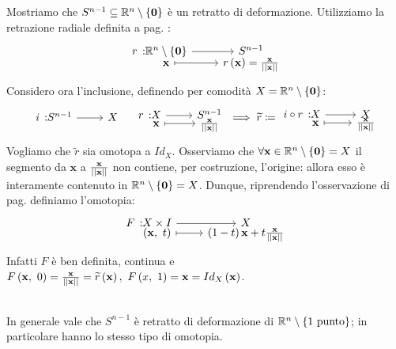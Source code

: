 \begin{example}
	\label{retrattosfera}
	Mostriamo che $S^{n-1}\subseteq \mathbb{R}^n\setminus\left\{\mathbf{0}\right\}$ è un retratto di deformazione. Utilizziamo la retrazione radiale definita a pag. \pageref{retrazioneradiale}:
		\begin{equation*}
		\funztot{r}{\realset^n\setminus\left\{\mathbf{0}\right\}}{S^{n-1}}{\mathbf{x}}{r\left(\mathbf{x}\right)=\frac{\mathbf{x}}{\labs \mathbf{x}\rabs}}
	\end{equation*}
Considero ora l'inclusione, definendo per comodità $X=\mathbb{R}^n\setminus\left\{\mathbf{0}\right\}$:
\begin{equation*}
	\funz{i}{S^{n-1}}{X}\quad 		\funztot{r}{X}{S^{n-1}}{\mathbf{x}}{\frac{\mathbf{x}}{\labs \mathbf{x}\rabs}}\implies \widetilde{r}\coloneqq\funztot{ i\circ r}{X}{X}{\mathbf{x}}{\frac{\mathbf{x}}{\labs \mathbf{x}\rabs}}
\end{equation*}
Vogliamo che $\widetilde{r}$ sia omotopa a $Id_X$.
Osserviamo che $\forall \mathbf{x}\in\mathbb{R}^n\setminus\left\{\mathbf{0}\right\}=X$ il segmento da $\mathbf{x}$ a $\frac{\mathbf{x}}{\left|\left| \mathbf{x}\right|\right|}$ non contiene, per costruzione, l'origine: allora esso è interamente contenuto in $\mathbb{R}^n\setminus \left\{\mathbf{0}\right\}=X$. Dunque, riprendendo l'osservazione di pag. \pageref{omotopiasegmento} definiamo l'omotopia:
\begin{equation*}
	\funztot{F}{X\times I}{X}{\left(\mathbf{x},\ t\right)}{\left(1-t\right)\mathbf{x}+t\frac{\mathbf{x}}{\labs \mathbf{x}\rabs}}
\end{equation*}
Infatti $F$ è ben definita, continua e $\mvf{F}{\mathbf{x}}{0}=\frac{\mathbf{x}}{\labs \mathbf{x}\rabs}=\widetilde{r}\left(\mathbf{x}\right),\ \mvf{F}{x}{1}=\mathbf{x}=Id_X\left(\mathbf{x}\right)$.
\end{example}
\begin{corollary}~{}\\
	In generale vale che $S^{n-1}$ è retratto di deformazione di $\mathbb{R}^n\setminus\left\{1\text{ punto}\right\}$; in particolare hanno lo stesso tipo di omotopia.
\end{corollary}
